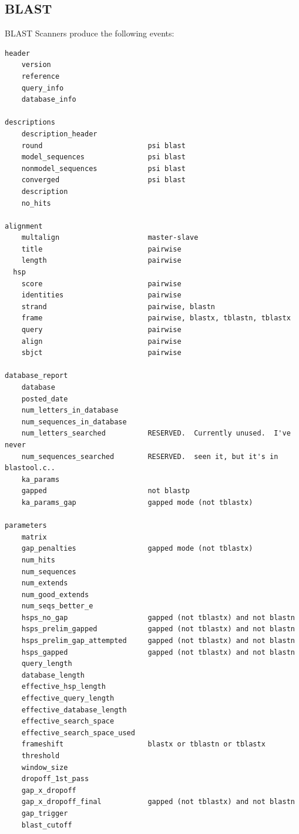 \documentclass{report}
\begin{document}
\subsection{BLAST}

BLAST Scanners produce the following events:

\begin{verbatim}
header
    version
    reference
    query_info
    database_info

descriptions
    description_header
    round                         psi blast
    model_sequences               psi blast
    nonmodel_sequences            psi blast
    converged                     psi blast
    description
    no_hits

alignment
    multalign                     master-slave
    title                         pairwise
    length                        pairwise
  hsp
    score                         pairwise
    identities                    pairwise
    strand                        pairwise, blastn
    frame                         pairwise, blastx, tblastn, tblastx
    query                         pairwise
    align                         pairwise
    sbjct                         pairwise

database_report
    database
    posted_date
    num_letters_in_database
    num_sequences_in_database
    num_letters_searched          RESERVED.  Currently unused.  I've never
    num_sequences_searched        RESERVED.  seen it, but it's in blastool.c..
    ka_params
    gapped                        not blastp
    ka_params_gap                 gapped mode (not tblastx)

parameters
    matrix
    gap_penalties                 gapped mode (not tblastx)
    num_hits                      
    num_sequences                 
    num_extends                   
    num_good_extends              
    num_seqs_better_e
    hsps_no_gap                   gapped (not tblastx) and not blastn
    hsps_prelim_gapped            gapped (not tblastx) and not blastn
    hsps_prelim_gap_attempted     gapped (not tblastx) and not blastn
    hsps_gapped                   gapped (not tblastx) and not blastn
    query_length
    database_length
    effective_hsp_length
    effective_query_length
    effective_database_length
    effective_search_space
    effective_search_space_used
    frameshift                    blastx or tblastn or tblastx
    threshold
    window_size
    dropoff_1st_pass
    gap_x_dropoff
    gap_x_dropoff_final           gapped (not tblastx) and not blastn
    gap_trigger
    blast_cutoff
\end{verbatim}
\end{document}
